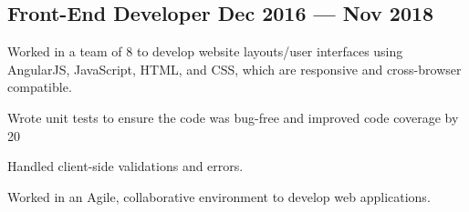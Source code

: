\subsection{{Front-End Developer \hfill Dec 2016 --- Nov 2018}}
\begin{zitemize}

\item Worked in a team of 8 to develop website layouts/user interfaces using AngularJS, JavaScript, HTML, and CSS, which are responsive and cross-browser compatible.

\item Wrote unit tests to ensure the code was bug-free and improved code coverage by 20%

\item Handled client-side validations and errors.

\item Worked in an Agile, collaborative environment to develop web applications.

\end{zitemize}

